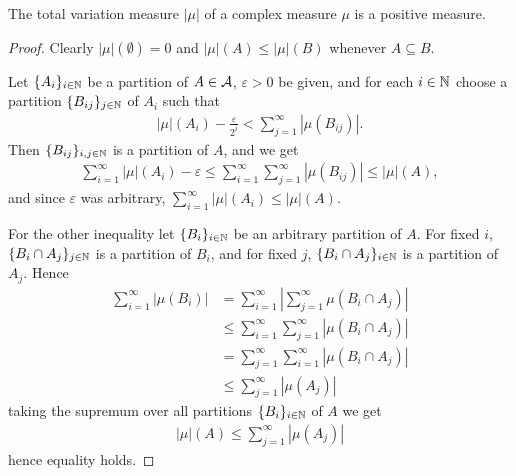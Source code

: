 \begin{theorem}
The total variation measure $|\mu|$ of a complex measure $\mu$ is a positive measure.
\end{theorem}
\begin{proof}
Clearly $|\mu|(\emptyset)=0$ and $|\mu|(A) \le |\mu|(B)$ whenever $A\subseteq B$.

Let $\{A_{i}\}_{i\in \mathbb{N}}$ be a partition of $A\in \mathcal{A}$, $\varepsilon>0$ be given, and for each $i\in \mathbb{N}$ choose a partition $\{B_{ij}\}_{j \in \mathbb{N}}$ of $A_{i}$ such that
\begin{align*}
	|\mu|(A_{i}) - \frac{\varepsilon}{2^{i}} < \sum_{j=1}^{\infty} | \mu(B_{ij}) |.
\end{align*}
Then $\{B_{ij}\}_{i,j\in \mathbb{N}}$ is a partition of $A$, and we get
\begin{align*}
	\sum_{i=1}^{\infty} |\mu|(A_{i}) - \varepsilon \le \sum_{i=1}^{\infty}\sum_{j=1}^{\infty} | \mu(B_{ij}) | \le |\mu|(A),
\end{align*}
and since $\varepsilon$ was arbitrary, $\sum_{i=1}^{\infty} |\mu|(A_{i}) \le |\mu|(A)$.

For the other inequality let $\{B_{i}\}_{i\in \mathbb{N}}$ be an arbitrary partition of $A$. For fixed $i$, $\{B_{i} \cap A_{j}\}_{j\in \mathbb{N}}$ is a partition of $B_{i}$, and for fixed $j$, $\{B_{i} \cap A_{j}\}_{i\in \mathbb{N}}$ is a partition of $A_{j}$. Hence
\begin{align*}
	\sum_{i=1}^{\infty}|\mu(B_{i})| &= \sum_{i=1}^{\infty} \left| \sum_{j=1}^{\infty} \mu(B_{i} \cap A_{j}) \right|\\
	&\le \sum_{i=1}^{\infty} \sum_{j=1}^{\infty} | \mu(B_{i} \cap A_{j}) | \\
	&= \sum_{j=1}^{\infty} \sum_{i=1}^{\infty} | \mu(B_{i} \cap A_{j}) |\\
	&\le \sum_{j=1}^{\infty} |\mu(A_{j})|
\end{align*}
taking the supremum over all partitions $\{B_{i}\}_{i\in \mathbb{N}}$ of $A$ we get
\begin{align*}
	|\mu|(A) \le \sum_{j=1}^{\infty} |\mu(A_{j})|
\end{align*}
hence equality holds.
\end{proof}


